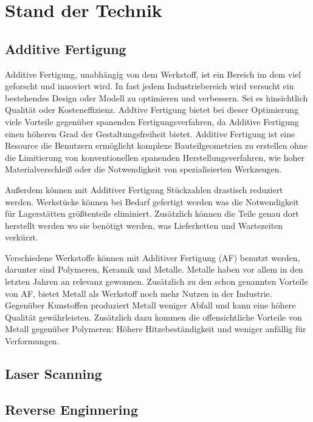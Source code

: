 \documentclass[../main.tex]{subfiles}
\begin{document}
\section{Stand der Technik}

\subsection{Additive Fertigung}

Additive Fertigung, unabhängig von dem Werkstoff, ist ein Bereich im dem viel
geforscht und innoviert wird. In fast jedem Industriebereich wird versucht ein
bestehendes Design oder Modell zu optimieren und verbessern. \cite{newMethod}
Sei es hinsichtlich Qualität oder Kosteneffizienz. Addtive Fertigung bietet bei 
dieser Optimierung viele Vorteile gegenüber spanenden Fertigungsverfahren, da 
Additive Fertigung einen höheren Grad der Gestaltungsfreiheit bietet. 
Additive Fertigung ist eine Resource die Benutzern ermöglicht komplexe 
Bauteilgeometrien zu erstellen ohne die Limitierung von konventionellen spanenden 
Herstellungsverfahren, wie hoher Materialverschleiß oder die Notwendigkeit von 
spezialisierten Werkzeugen. \cite{Vafadar.2021} 

Außerdem können mit Additiver Fertigung Stückzahlen drastisch reduziert werden.
Werkstücke können bei Bedarf gefertigt werden was die Notwendigkeit für Lagerstätten
größtenteils eliminiert. Zusätzlich können die Teile genau dort herstellt werden wo 
sie benötigt werden, was Lieferketten und Wartezeiten verkürzt.

Verschiedene Werkstoffe können mit Additiver Fertigung (AF) benutzt werden, darunter
sind Polymeren, Keramik und Metalle. Metalle haben vor allem in den letzten Jahren 
an relevanz gewonnen. Zusätzlich zu den schon genannten Vorteile von AF, 
bietet Metall als Werkstoff noch mehr Nutzen in der Industrie. Gegenüber Kunstoffen
produziert Metall weniger Abfall und kann eine höhere Qualität gewährleisten.
Zusätzlich dazu kommen die offensichtliche Vorteile von Metall gegenüber Polymeren: 
Höhere Hitzebeständigkeit und weniger anfällig für Verformungen.
 




\subsection{Laser Scanning}

\subsection{Reverse Enginnering}
\end{document}
